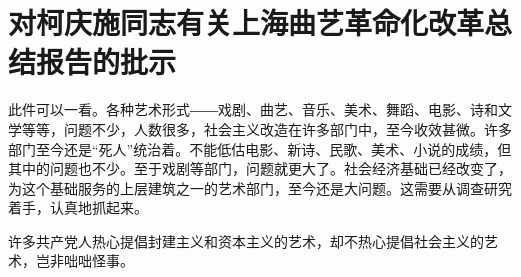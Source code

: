 \section[对柯庆施同志有关上海曲艺革命化改革总结报告的批示（一九六三年十二月十二日）]{对柯庆施同志有关上海曲艺革命化改革总结报告的批示}


此件可以一看。各种艺术形式――戏剧、曲艺、音乐、美术、舞蹈、电影、诗和文学等等，问题不少，人数很多，社会主义改造在许多部门中，至今收效甚微。许多部门至今还是“死人”统治着。不能低估电影、新诗、民歌、美术、小说的成绩，但其中的问题也不少。至于戏剧等部门，问题就更大了。社会经济基础已经改变了，为这个基础服务的上层建筑之一的艺术部门，至今还是大问题。这需要从调查研究着手，认真地抓起来。

许多共产党人热心提倡封建主义和资本主义的艺术，却不热心提倡社会主义的艺术，岂非咄咄怪事。


